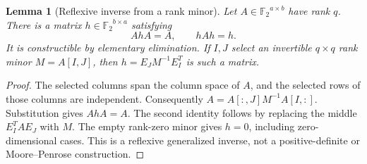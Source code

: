 \documentclass[11pt,letterpaper]{article}
\newcommand{\F}{{\mathbb F_2}}
\newtheorem{lemma}[theorem]{Lemma}
\theoremstyle{definition}
\theoremstyle{remark}
\numberwithin{equation}{section}
\begin{document}
\begin{lemma}[Reflexive inverse from a rank minor]
\label{lem:inverse}
Let $A\in\F^{a\times b}$ have rank $q$. There is a matrix
$h\in\F^{b\times a}$ satisfying
\begin{equation}
 AhA=A,\qquad hAh=h.
 \label{eq:reflexive}
\end{equation}
It is constructible by elementary elimination. If $I,J$ select an
invertible $q\times q$ rank minor $M=A[I,J]$, then
$h=E_JM^{-1}E_I^T$ is such a matrix.
\end{lemma}
\begin{proof}
The selected columns span the column space of $A$, and the selected rows
of those columns are independent. Consequently
$A=A[:,J]M^{-1}A[I,:]$. Substitution gives $AhA=A$. The second identity
follows by replacing the middle $E_I^TAE_J$ with $M$. The empty rank-zero
minor gives $h=0$, including zero-dimensional cases. This is a reflexive
generalized inverse, not a positive-definite or Moore--Penrose construction.
\end{proof}
\end{document}
